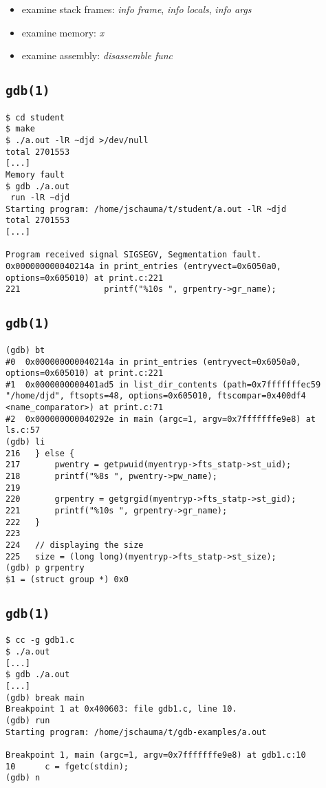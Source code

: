 \documentclass[xga]{xdvislides}
\begin{document}
\begin{itemize}
	\item examine stack frames: {\em info frame}, {\em info locals}, {\em info
		args}
	\item examine memory: {\em x}
	\item examine assembly: {\em disassemble func}
\end{itemize}

\subsection{{\tt gdb(1)}}
\begin{verbatim}
$ cd student
$ make
$ ./a.out -lR ~djd >/dev/null
total 2701553
[...]
Memory fault
$ gdb ./a.out
 run -lR ~djd
Starting program: /home/jschauma/t/student/a.out -lR ~djd
total 2701553
[...]

Program received signal SIGSEGV, Segmentation fault.
0x000000000040214a in print_entries (entryvect=0x6050a0, options=0x605010) at print.c:221
221	                printf("%10s ", grpentry->gr_name);
\end{verbatim}

\subsection{{\tt gdb(1)}}
\begin{verbatim}
(gdb) bt
#0  0x000000000040214a in print_entries (entryvect=0x6050a0, options=0x605010) at print.c:221
#1  0x0000000000401ad5 in list_dir_contents (path=0x7fffffffec59 "/home/djd", ftsopts=48, options=0x605010, ftscompar=0x400df4 <name_comparator>) at print.c:71
#2  0x000000000040292e in main (argc=1, argv=0x7fffffffe9e8) at ls.c:57
(gdb) li
216	  } else {
217	      pwentry = getpwuid(myentryp->fts_statp->st_uid);
218	      printf("%8s ", pwentry->pw_name);
219
220	      grpentry = getgrgid(myentryp->fts_statp->st_gid);
221	      printf("%10s ", grpentry->gr_name);
222	  }
223
224	  // displaying the size
225	  size = (long long)(myentryp->fts_statp->st_size);
(gdb) p grpentry
$1 = (struct group *) 0x0
\end{verbatim}

\subsection{{\tt gdb(1)}}
\begin{verbatim}
$ cc -g gdb1.c
$ ./a.out
[...]
$ gdb ./a.out
[...]
(gdb) break main
Breakpoint 1 at 0x400603: file gdb1.c, line 10.
(gdb) run
Starting program: /home/jschauma/t/gdb-examples/a.out

Breakpoint 1, main (argc=1, argv=0x7fffffffe9e8) at gdb1.c:10
10		c = fgetc(stdin);
(gdb) n

\end{verbatim}
\end{document}
